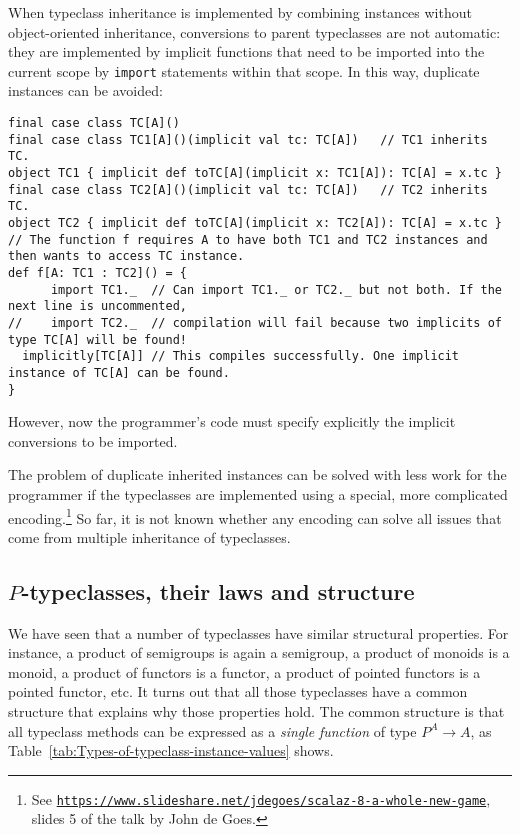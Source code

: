 When typeclass inheritance is implemented by combining instances without
object-oriented inheritance, conversions to parent typeclasses are
not automatic: they are implemented by implicit functions that need
to be imported into the current scope by \lstinline!import! statements
within that scope. In this way, duplicate instances can be avoided:
\begin{lstlisting}
final case class TC[A]()
final case class TC1[A]()(implicit val tc: TC[A])   // TC1 inherits TC.
object TC1 { implicit def toTC[A](implicit x: TC1[A]): TC[A] = x.tc }
final case class TC2[A]()(implicit val tc: TC[A])   // TC2 inherits TC.
object TC2 { implicit def toTC[A](implicit x: TC2[A]): TC[A] = x.tc }
// The function f requires A to have both TC1 and TC2 instances and then wants to access TC instance.
def f[A: TC1 : TC2]() = {
      import TC1._  // Can import TC1._ or TC2._ but not both. If the next line is uncommented,
//    import TC2._  // compilation will fail because two implicits of type TC[A] will be found!
  implicitly[TC[A]] // This compiles successfully. One implicit instance of TC[A] can be found.
}
\end{lstlisting}
However, now the programmer\textsf{'}s code must specify explicitly the implicit
conversions to be imported.

The problem of duplicate inherited instances can be solved with less
work for the programmer if the typeclasses are implemented using a
special, more complicated encoding.\footnote{See \texttt{\href{https://www.slideshare.net/jdegoes/scalaz-8-a-whole-new-game}{https://www.slideshare.net/jdegoes/scalaz-8-a-whole-new-game}},
slides 5 of the talk by John de
Goes.} So far, it is not known whether any encoding can solve all issues
that come from multiple inheritance of typeclasses.

\subsection{$P$-typeclasses, their laws and structure\label{subsec:P-algebraic-typeclasses}}

We have seen that a number of typeclasses have similar structural
properties. For instance, a product of semigroups is again a semigroup,
a product of monoids is a monoid, a product of functors is a functor,
a product of pointed functors is a pointed functor, etc. It turns
out that all those typeclasses have a common structure that explains
why those properties hold. The common structure is that all typeclass
methods can be expressed as a \emph{single} \emph{function} of type
$P^{A}\rightarrow A$, as Table~\ref{tab:Types-of-typeclass-instance-values}
shows.

